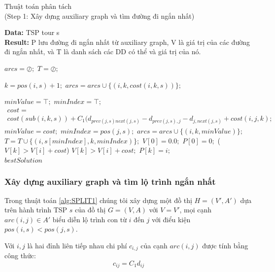 \documentclass[a4paper,12pt]{report}
\begin{document}
\begin{algorithm}[H]
\caption{$\text{Thuật toán phân tách}$ \\ (Step 1: Xây dựng auxiliary graph và tìm đường đi ngắn nhất)}
\textbf{Data:} TSP tour s\\
\textbf{Result:} P lưu đường đi ngắn nhất từ auxiliary graph, V là giá trị của các đường đi ngắn nhất, và T là danh sách các DD có thể và giá trị của nó.
\begin{algorithmic}[1]
\State $arcs=\oslash;$
\State $T=\oslash;$

\State $k=pos(i,s)+1;$
\State $arcs=arcs \cup \{(i,k,cost(i,k,s))\}; $
\EndFor
{}

\State $minValue=\top;$
\State $minIndex=\top;$
\State $\begin{array}{l}cost = \\ cost(sub(i,k,s))+C_1(d_{prev(j,s)next(j,s)}-d_{prev(j,s),j}-d_{j,next(j,s)}+cost(i,j,k); \end{array}$
\State $minValue=cost;$
\State $minIndex=pos(j,s);$
\EndIf
\EndIf
\EndFor
\State $arcs=arcs \cup \{(i,k,minValue)\};$
\State $T=T\cup\{(i,s[minIndex],k,minIndex)\};$
\EndIf
\EndFor
\EndFor
\State $V[0]=0.0;$
\State $P[0]=0;$
\If($V[k] > V[i]+cost$)
\State $V[k]>V[i]+cost;$
\State $P[k]=i;$
\EndIf
\EndFor
\EndFor\\
\Return $bestSolution$
\end{algorithmic}
\label{alg:SPLIT1}
\end{algorithm}
\subsubsection{Xây dựng auxiliary graph và tìm lộ trình ngắn nhất}
Trong thuật toán \ref{alg:SPLIT1} chúng tôi xây dựng một đồ thị $H=(V',A')$ dựa trên hành trình TSP $s$ của đồ thị $G=(V,A)$ với $V=V'$, mọi cạnh $arc(i,j) \in A'$ biểu diễn lộ trình con từ $i$ đến $j$ với điểu kiện $pos(i,s)<pos(j,s)$.

Với $i,j$ là hai đỉnh liên tiếp nhau chi phí $c_{i,j}$ của cạnh $arc(i,j)$ được tính bằng công thức:
$$c_{ij}=C_1d_{ij}$$ 
\end{document}
